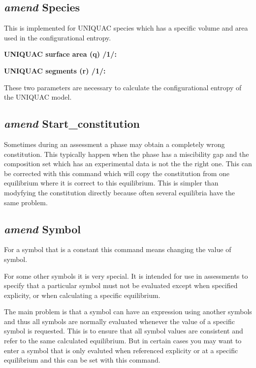 \documentclass[11pt]{article}
\begin{document}
\subsection{{\em amend} Species}

This is implemented for UNIQUAC species which has a specific volume
and area used in the configurational entropy.

{\bf UNIQUAC surface area (q) /1/:}

{\bf UNIQUAC segments (r) /1/:}

These two parameters are necessary to calculate the configurational
entropy of the UNIQUAC model.

\hypertarget{Amend start_constitution}{}
\subsection{{\em amend} Start\_constitution}\label{sc:amend}

Sometimes during an assessment a phase may obtain a completely wrong
constitution.  This typically happen when the phase has a miscibility
gap and the composition set which has an experimental data is not the
the right one.  This can be corrected with this command which will
copy the constitution from one equilibrium where it is correct to this
equilibrium.  This is simpler than modyfying the constitution directly
because often several equilibria have the same problem.

\hypertarget{Amend symbol}{}
\subsection{{\em amend} Symbol}\label{sc:amendsym}

For a symbol that is a constant this command means changing the value
of symbol.

For some other symbols it is very special.  It is intended for use in
assessments to specify that a particular symbol must not be evaluated
except when specified explicity, or when calculating a specific
equilibrium.

The main problem is that a symbol can have an expression using another
symbols and thus all symbols are normally evaluated whenever the value
of a specific symbol is requested.  This is to ensure that all symbol
values are consistent and refer to the same calculated equilibrium.
But in certain cases you may want to enter a symbol that is only
evaluted when referenced explicity or at a specific equilibrium and
this can be set with this command.
\end{document}
